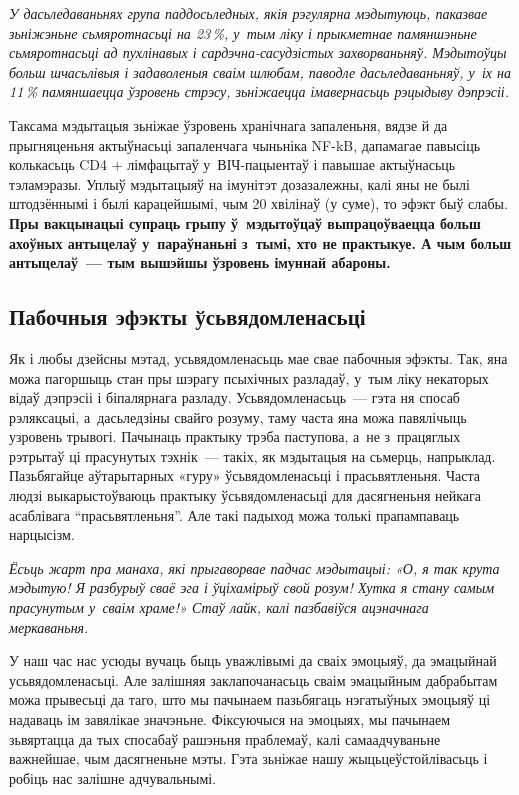 \emph{У дасьледаваньнях група паддосьледных, якія рэгулярна мэдытуюць, паказвае зьніжэньне сьмяротнасьці на 23\,\%, у~тым ліку і прыкметнае памяншэньне сьмяротнасьці ад пухлінавых і сардэчна-сасудзістых захворваньняў. Мэдытоўцы больш шчасьлівыя і задаволеныя сваім шлюбам, паводле дасьледаваньняў, у~іх на 11\,\% памяншаецца ўзровень стрэсу, зьніжаецца імавернасьць рэцыдыву дэпрэсіі.}

Таксама мэдытацыя зьніжае ўзровень хранічнага запаленьня, вядзе й да прыгняценьня актыўнасьці запаленчага чыньніка NF-kB, дапамагае павысіць колькасьць CD4 + лімфацытаў у~ВІЧ-пацыентаў і павышае актыўнасьць тэламэразы. Уплыў мэдытацыяў на імунітэт дозазалежны, калі яны не былі штодзённымі і былі карацейшымі, чым 20 хвілінаў (у суме), то эфэкт быў слабы. \textbf{Пры вакцынацыі супраць грыпу ў~мэдытоўцаў выпрацоўваецца больш ахоўных антыцелаў у~параўнаньні з~тымі, хто не практыкуе. А чым больш антыцелаў~--- тым вышэйшы ўзровень імуннай абароны.}

\subsection*{Пабочныя эфэкты ўсьвядомленасьці}

Як і любы дзейсны мэтад, усьвядомленасьць мае свае пабочныя эфэкты. Так, яна можа пагоршыць стан пры шэрагу псыхічных разладаў, у~тым ліку некаторых відаў дэпрэсіі і біпалярнага разладу. Усьвядомленасьць~--- гэта ня спосаб рэляксацыі, а~дасьледзіны свайго розуму, таму часта яна можа павялічыць узровень трывогі. Пачынаць практыку трэба паступова, а~не з~працяглых рэтрытаў ці прасунутых тэхнік~--- такіх, як мэдытацыя на сьмерць, напрыклад. Пазьбягайце аўтарытарных «гуру» ўсьвядомленасьці і прасьвятленьня. Часта людзі выкарыстоўваюць практыку ўсьвядомленасьці для дасягненьня нейкага асаблівага ``прасьвятленьня''. Але такі падыход можа толькі прапампаваць нарцысізм.

\emph{Ёсьць жарт пра манаха, які прыгаворвае падчас мэдытацыі: «О, я так крута мэдытую! Я разбурыў сваё эга і ўціхамірыў свой розум! Хутка я стану самым прасунутым у~сваім храме!» Стаў лайк, калі пазбавіўся ацэначнага меркаваньня.}

У наш час нас усюды вучаць быць уважлівымі да сваіх эмоцыяў, да эмацыйнай усьвядомленасьці. Але залішняя заклапочанасьць сваім эмацыйным дабрабытам можа прывесьці да таго, што мы пачынаем пазьбягаць нэгатыўных эмоцыяў ці надаваць ім завялікае значэньне. Фіксуючыся на эмоцыях, мы пачынаем зьвяртацца да тых спосабаў рашэньня праблемаў, калі самаадчуваньне важнейшае, чым дасягненьне мэты. Гэта зьніжае нашу жыцьцеўстойлівасьць і робіць нас залішне адчувальнымі.

